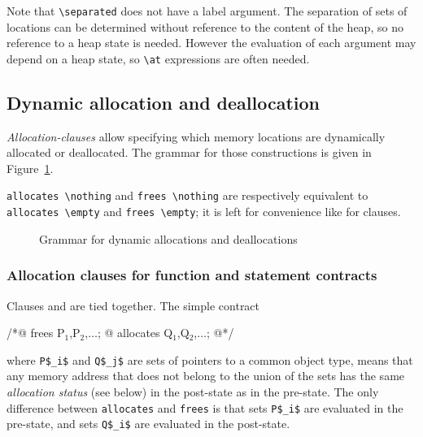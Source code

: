 Note that \lstinline|\separated| does not have a label argument. The separation of sets of locations
can be determined without reference to the content of the heap, so no reference to a heap state is needed.
However the evaluation of each argument may depend on a heap state, so \lstinline|\at| expressions are often needed.


\subsection{Dynamic allocation and deallocation}
\label{sec:allocation-clause}

\experimental

\textsl{Allocation-clauses} allow specifying which memory locations
are dynamically allocated or deallocated.
The grammar for those constructions is given in Figure~\ref{fig:gram:allocation}.

\lstinline|allocates \nothing| and \lstinline|frees \nothing| are respectively
equivalent to \lstinline|allocates \empty| and \lstinline|frees \empty|;
it is left for convenience like for \assigns clauses.

\begin{figure}[htp]
  \begin{cadre}
      
    \end{cadre}
  \caption{Grammar for dynamic allocations and deallocations}
\label{fig:gram:allocation}
\end{figure}

\subsubsection{Allocation clauses for function and statement contracts}
\label{subsec:allocation-contract}

Clauses \allocates and \frees are tied together. The simple contract
\begin{listing-nonumber}
/*@ frees P$_1$,P$_2$,$\dots$;
  @ allocates Q$_1$,Q$_2$,$\dots$;
  @*/
\end{listing-nonumber}
where \lstinline|P$_i$| and \lstinline|Q$_j$| are sets of pointers to
a common object type,
means that any memory address that does not belong to the union of the sets
has the same {\sl allocation status}
(see below) in the post-state as in the pre-state. The only difference
between \lstinline|allocates| and \lstinline|frees| is that sets
\lstinline|P$_i$| are evaluated
in the pre-state, and sets \lstinline|Q$_i$| are evaluated in the post-state.


